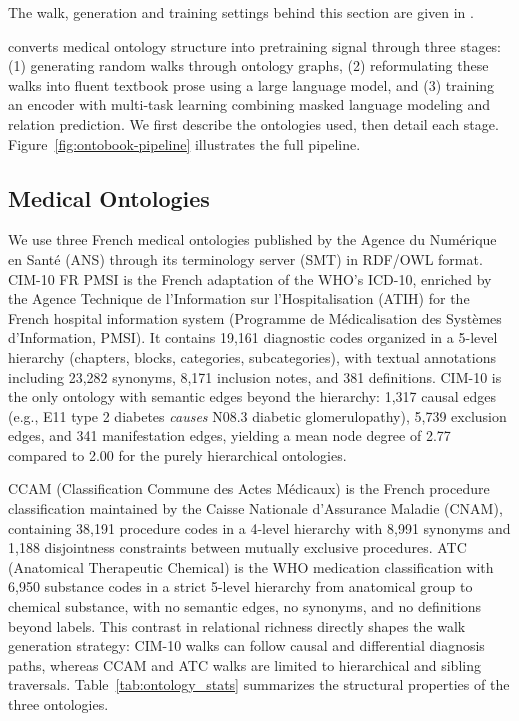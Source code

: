 \noindent The walk, generation and training settings behind this section are given in .
\label{sec:method}

\method converts medical ontology structure into pretraining signal through three stages: (1) generating random walks through ontology graphs, (2) reformulating these walks into fluent textbook prose using a large language model, and (3) training an encoder with multi-task learning combining masked language modeling and relation prediction. We first describe the ontologies used, then detail each stage. Figure~\ref{fig:ontobook-pipeline} illustrates the full pipeline.

\subsection{Medical Ontologies}
\label{sec:ontologies}

\begin{reviewread}
We use three French medical ontologies published by the Agence du Num\'erique en Sant\'e (ANS) through its terminology server (SMT) in RDF/OWL format. CIM-10 FR PMSI is the French adaptation of the WHO's ICD-10, enriched by the Agence Technique de l'Information sur l'Hospitalisation (ATIH) for the French hospital information system (Programme de M\'edicalisation des Syst\`emes d'Information, PMSI). It contains 19,161 diagnostic codes organized in a 5-level hierarchy (chapters, blocks, categories, subcategories), with textual annotations including 23,282 synonyms, 8,171 inclusion notes, and 381 definitions. CIM-10 is the only ontology with semantic edges beyond the hierarchy: 1,317 causal edges (e.g., E11 type 2 diabetes \textit{causes} N08.3 diabetic glomerulopathy), 5,739 exclusion edges, and 341 manifestation edges, yielding a mean node degree of 2.77 compared to 2.00 for the purely hierarchical ontologies.
\end{reviewread}

\begin{reviewread}
CCAM (Classification Commune des Actes M\'edicaux) is the French procedure classification maintained by the Caisse Nationale d'Assurance Maladie (CNAM), containing 38,191 procedure codes in a 4-level hierarchy with 8,991 synonyms and 1,188 disjointness constraints between mutually exclusive procedures. ATC (Anatomical Therapeutic Chemical) is the WHO medication classification with 6,950 substance codes in a strict 5-level hierarchy from anatomical group to chemical substance, with no semantic edges, no synonyms, and no definitions beyond labels. This contrast in relational richness directly shapes the walk generation strategy: CIM-10 walks can follow causal and differential diagnosis paths, whereas CCAM and ATC walks are limited to hierarchical and sibling traversals. Table~\ref{tab:ontology_stats} summarizes the structural properties of the three ontologies.
\end{reviewread}

